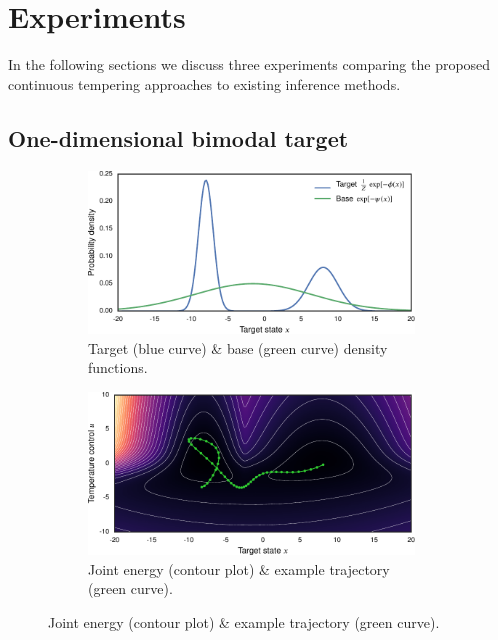 \section{Experiments}\label{sec:ct-experiments}

In the following sections we discuss three experiments comparing the proposed continuous tempering approaches to existing inference methods.

\subsection{One-dimensional bimodal target}\label{subsec:exp-bimodal-target}

\begin{figure}[!t]
\begin{subfigure}[b]{.5\linewidth}
\vskip 0pt
\centering
\includegraphics[width=0.95\textwidth]{images/continuous-tempering/bimodal-gm-target-and-gaussian-base} 
\caption{Target (blue curve) \& base (green curve) density functions.}\label{sfig:bimodal-gm-target-and-gaussian-base}
\end{subfigure}%
\begin{subfigure}[b]{.5\linewidth}
\vskip 0pt
\centering
\includegraphics[width=0.95\textwidth]{images/continuous-tempering/jct-energy-and-trajectory} 
\caption{Joint energy (contour plot) \& example trajectory (green curve).}\label{sfig:jct-energy-and-trajectory}

\end{subfigure}
\end{figure}
